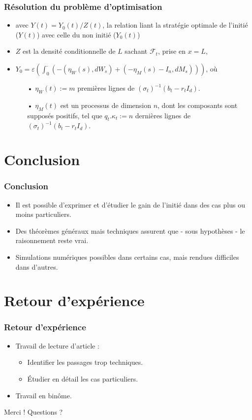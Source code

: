 \documentclass{beamer}
\begin{document}
\begin{frame}
\frametitle{Résolution du problème d'optimisation}
\begin{itemize}
\item avec $Y(t) = Y_0(t) / Z(t)$, la relation liant la stratégie optimale de l'initié ($Y(t)$) avec celle du non initié ($Y_0(t)$)\\
\item $Z$ est la densité conditionnelle de $L$ sachant $\mathcal{F}_t$, prise en $x = L$,
\item $Y_0 = \varepsilon \left(\displaystyle \int_{0}^{\cdot} \left(- \left( \eta_W \left( s \right), dW_s \right) + \left( - \eta_M \left(  s \right) - I_n, dM_s \right) \right)\right)$, où
\begin{itemize}
\item[•] $\eta_W \left( t \right) := m$ premières lignes de $(\sigma_t)^{-1}(b_t - r_t I_d)$.\
\item[•] $ \eta_M \left( t \right)$ est un processus de dimension $n$, dont les composants sont supposés positifs, tel que $q_t. \kappa_t := n$ dernières lignes de $(\sigma_t)^{-1}(b_t - r_t I_d)$.
\end{itemize}
\end{itemize}
\end{frame}

\section{Conclusion}

\begin{frame}
\frametitle{Conclusion}
\begin{itemize}
\item Il est possible d'exprimer et d'étudier le gain de l'initié dans des cas plus ou moins particuliers.
\item Des théorèmes généraux mais techniques assurent que - sous hypothèses - le raisonnement reste vrai.
\item Simulations numériques possibles dans certains cas, mais rendues difficiles dans d'autres.
\end{itemize}
\end{frame}

\section{Retour d'expérience}

\begin{frame}
\frametitle{Retour d'expérience}
\begin{itemize}
\item Travail de lecture d'article :
	\begin{itemize}
	\item Identifier les passages trop techniques.
	\item Étudier en détail les cas particuliers.
	\end{itemize}
\item Travail en binôme.
\end{itemize}
\end{frame}


\begin{frame}
\Huge \center Merci !
\huge\center Questions ?
\end{frame}


\begin{frame}
\end{frame} %
\end{document}
